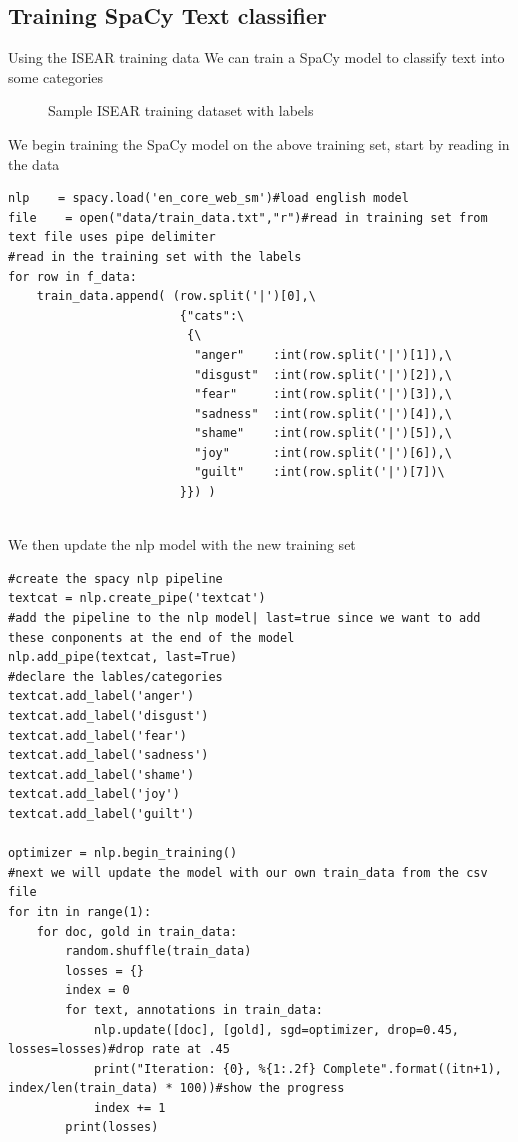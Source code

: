 \clearpage

\subsection{Training SpaCy Text classifier}
Using the ISEAR training data
We can train a SpaCy model to classify text into some categories
\begin{figure}[h]
  \centering
  \caption{Sample ISEAR training dataset with labels}
  \label{fig:ALAP:sm1}
\end{figure}

We begin training the SpaCy model on the above training set,
start by reading in the data 
\begin{lstlisting}
nlp    = spacy.load('en_core_web_sm')#load english model
file    = open("data/train_data.txt","r")#read in training set from text file uses pipe delimiter
#read in the training set with the labels
for row in f_data:
    train_data.append( (row.split('|')[0],\
                        {"cats":\
                         {\
                          "anger"    :int(row.split('|')[1]),\
                          "disgust"  :int(row.split('|')[2]),\
                          "fear"     :int(row.split('|')[3]),\
                          "sadness"  :int(row.split('|')[4]),\
                          "shame"    :int(row.split('|')[5]),\
                          "joy"      :int(row.split('|')[6]),\
                          "guilt"    :int(row.split('|')[7])\
                        }}) )
                        
\end{lstlisting}
\clearpage
We then update the nlp model with the new training set
\begin{lstlisting}
#create the spacy nlp pipeline
textcat = nlp.create_pipe('textcat')
#add the pipeline to the nlp model| last=true since we want to add these conponents at the end of the model
nlp.add_pipe(textcat, last=True)
#declare the lables/categories
textcat.add_label('anger')
textcat.add_label('disgust')
textcat.add_label('fear')
textcat.add_label('sadness')
textcat.add_label('shame')
textcat.add_label('joy')
textcat.add_label('guilt')

optimizer = nlp.begin_training()
#next we will update the model with our own train_data from the csv file
for itn in range(1):
    for doc, gold in train_data:
        random.shuffle(train_data)
        losses = {}
        index = 0
        for text, annotations in train_data:
            nlp.update([doc], [gold], sgd=optimizer, drop=0.45, losses=losses)#drop rate at .45
            print("Iteration: {0}, %{1:.2f} Complete".format((itn+1), index/len(train_data) * 100))#show the progress
            index += 1
        print(losses)
 
\end{lstlisting}


